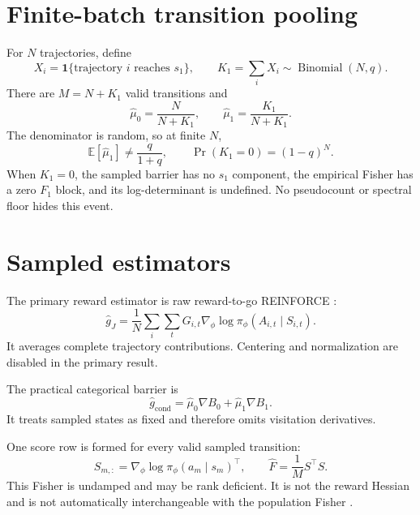 \documentclass[10pt,a4paper]{article}
\begin{document}
\section{Finite-batch transition pooling}
For $N$ trajectories, define
\begin{equation}
X_i=\mathbf1\{\text{trajectory }i\text{ reaches }s_1\},\qquad
K_1=\sum_iX_i\sim\operatorname{Binomial}(N,q).
\end{equation}
There are $M=N+K_1$ valid transitions and
\begin{equation}
\widehat\mu_0=\frac{N}{N+K_1},\qquad
\widehat\mu_1=\frac{K_1}{N+K_1}.
\end{equation}
The denominator is random, so at finite $N$,
\begin{equation}
\mathbb E[\widehat\mu_1]\ne\frac{q}{1+q},
\qquad \Pr(K_1=0)=(1-q)^N.
\end{equation}
When $K_1=0$, the sampled barrier has no $s_1$ component, the empirical Fisher
has a zero $F_1$ block, and its log-determinant is undefined. No pseudocount or
spectral floor hides this event.

\section{Sampled estimators}
The primary reward estimator is raw reward-to-go REINFORCE \cite{Williams1992}:
\begin{equation}
\widehat g_J=\frac1N\sum_i\sum_tG_{i,t}
\nabla_\phi\log\pi_\phi(A_{i,t}\mid S_{i,t}).
\end{equation}
It averages complete trajectory contributions. Centering and normalization
are disabled in the primary result.

The practical categorical barrier is
\begin{equation}
\widehat g_{\mathrm{cond}}=
\widehat\mu_0\nabla B_0+\widehat\mu_1\nabla B_1.
\end{equation}
It treats sampled states as fixed and therefore omits visitation derivatives.

One score row is formed for every valid sampled transition:
\begin{equation}
S_{m,:}=\nabla_\phi\log\pi_\phi(a_m\mid s_m)^{\top},
\qquad \widehat F=\frac1M S^{\top}S.
\end{equation}
This Fisher is undamped and may be rank deficient. It is not the reward
Hessian and is not automatically interchangeable with the population Fisher
\cite{kunstner2019}.
\end{document}
